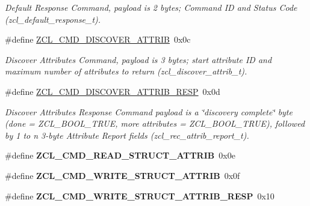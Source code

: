 \begin{DoxyCompactItemize}
\begin{DoxyCompactList}\small\item\em Default Response Command, payload is 2 bytes; Command ID and Status Code (zcl\+\_\+default\+\_\+response\+\_\+t). \end{DoxyCompactList}\item 
\#define \hyperlink{group__zcl_ga2919d6fc8068efac4c9969938a4b9ff5}{Z\+C\+L\+\_\+\+C\+M\+D\+\_\+\+D\+I\+S\+C\+O\+V\+E\+R\+\_\+\+A\+T\+T\+R\+IB}~0x0c
\begin{DoxyCompactList}\small\item\em Discover Attributes Command, payload is 3 bytes; start attribute ID and maximum number of attributes to return (zcl\+\_\+discover\+\_\+attrib\+\_\+t). \end{DoxyCompactList}\item 
\#define \hyperlink{group__zcl_gae15c30229c1d8a8cdee1bd92b2cc6a15}{Z\+C\+L\+\_\+\+C\+M\+D\+\_\+\+D\+I\+S\+C\+O\+V\+E\+R\+\_\+\+A\+T\+T\+R\+I\+B\+\_\+\+R\+E\+SP}~0x0d
\begin{DoxyCompactList}\small\item\em Discover Attributes Response Command payload is a \char`\"{}discovery complete\char`\"{} byte (done = Z\+C\+L\+\_\+\+B\+O\+O\+L\+\_\+\+T\+R\+UE, more attributes = Z\+C\+L\+\_\+\+B\+O\+O\+L\+\_\+\+T\+R\+UE), followed by 1 to n 3-\/byte Attribute Report fields (zcl\+\_\+rec\+\_\+attrib\+\_\+report\+\_\+t). \end{DoxyCompactList}\item 
\mbox{\label{group__zcl_ga6a1346696520f086e414bf00e535ef51}} 
\#define {\bfseries Z\+C\+L\+\_\+\+C\+M\+D\+\_\+\+R\+E\+A\+D\+\_\+\+S\+T\+R\+U\+C\+T\+\_\+\+A\+T\+T\+R\+IB}~0x0e
\item 
\mbox{\label{group__zcl_ga319ebdd453d91eb2fa8ca8334a313e2f}} 
\#define {\bfseries Z\+C\+L\+\_\+\+C\+M\+D\+\_\+\+W\+R\+I\+T\+E\+\_\+\+S\+T\+R\+U\+C\+T\+\_\+\+A\+T\+T\+R\+IB}~0x0f
\item 
\mbox{\label{group__zcl_ga70640c0c70451c2f2a88dcb020a64298}} 
\#define {\bfseries Z\+C\+L\+\_\+\+C\+M\+D\+\_\+\+W\+R\+I\+T\+E\+\_\+\+S\+T\+R\+U\+C\+T\+\_\+\+A\+T\+T\+R\+I\+B\+\_\+\+R\+E\+SP}~0x10
\end{DoxyCompactItemize}
\label{_amgrp01747264fe7bf50731df0522c351974e}%
